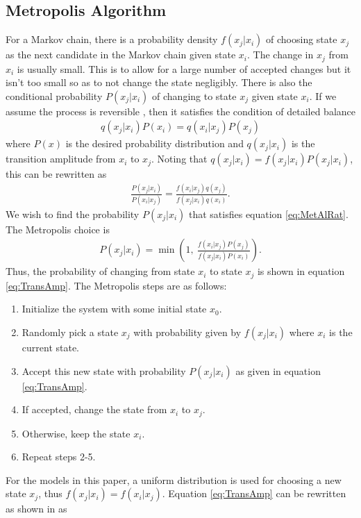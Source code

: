 \documentclass[11pt]{article}
\begin{document}
\subsection{Metropolis Algorithm}
For a Markov chain, there is a probability density $f(x_j|x_i)$ of choosing state $x_j$ as the next candidate in the Markov chain given state $x_i$. The change in $x_j$ from $x_i$ is usually small. This is to allow for a large number of accepted changes but it isn't too small so as to not change the state negligibly. There is also the conditional probability $P(x_j|x_i)$ of changing to state $x_j$ given state $x_i$. If we assume the process is reversible \cite{MonteCarloMetropolis}, then it satisfies the condition of detailed balance
\begin{align}
	q(x_j|x_i)P(x_i)=q(x_i|x_j)P(x_j)
\end{align}
where $P(x)$ is the desired probability distribution and $q(x_j|x_i)$ is the transition amplitude from $x_i$ to $x_j$. Noting that $q(x_j|x_i)=f(x_j|x_i)P(x_j|x_i)$, this can be rewritten as
\begin{align}
	\frac{P(x_j|x_i)}{P(x_i|x_j)}=\frac{f(x_i|x_j)q(x_j)}{f(x_j|x_i)q(x_i)}.
	\label{eq:MetAlRat}
\end{align}
We wish to find the probability $P(x_j|x_i)$ that satisfies equation \ref{eq:MetAlRat}. The Metropolis choice is
\begin{align}
	P(x_j|x_i)=\min\left(1,\ \frac{f(x_i|x_j)P(x_j)}{f(x_j|x_i)P(x_i)}\right).
	\label{eq:TransAmp}
\end{align}
Thus, the probability of changing from state $x_i$ to state $x_j$ is shown in equation \ref{eq:TransAmp}. The Metropolis steps are as follows:
\begin{enumerate}
\item Initialize the system with some initial state $x_0$.
\item Randomly pick a state $x_j$ with probability given by $f(x_j|x_i)$ where $x_i$ is the current state.
\item Accept this new state with probability $P(x_j|x_i)$ as given in equation \ref{eq:TransAmp}.
\item If accepted, change the state from $x_i$ to $x_j$.
\item Otherwise, keep the state $x_i$.
\item Repeat steps 2-5.
\end{enumerate}
For the models in this paper, a uniform distribution is used for choosing a new state $x_j$, thus $f(x_j|x_i)=f(x_i|x_j)$. Equation \ref{eq:TransAmp} can be rewritten as shown in \cite{MonteCarloMetropolis} as
\end{document}
